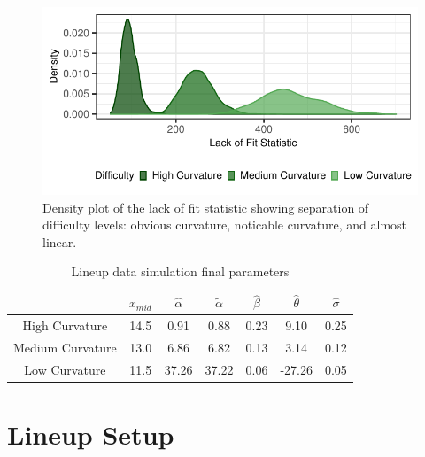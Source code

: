 \documentclass[print]{nuthesis}
\begin{document}
\begin{figure}[tbp]

{\centering \includegraphics[width=1\linewidth,]{thesis_files/figure-latex/lof-density-curves-1} 

}

\caption[Lineup parameter selection]{Density plot of the lack of fit statistic showing separation of difficulty levels: obvious curvature, noticable curvature, and almost linear.}\label{fig:lof-density-curves}
\end{figure}

\begin{table}

\caption{\label{tab:parameter-data}Lineup data simulation final parameters}
\centering
\begin{tabular}[t]{ccccccc}
\toprule
 & $x_{mid}$ & $\hat\alpha$ & $\tilde\alpha$ & $\hat\beta$ & $\hat\theta$ & $\hat\sigma$\\
\midrule
High Curvature & 14.5 & 0.91 & 0.88 & 0.23 & 9.10 & 0.25\\
Medium Curvature & 13.0 & 6.86 & 6.82 & 0.13 & 3.14 & 0.12\\
Low Curvature & 11.5 & 37.26 & 37.22 & 0.06 & -27.26 & 0.05\\
\bottomrule
\end{tabular}
\end{table}

\hypertarget{lineup-setup}{%
\section{Lineup Setup}\label{lineup-setup}}
\end{document}
